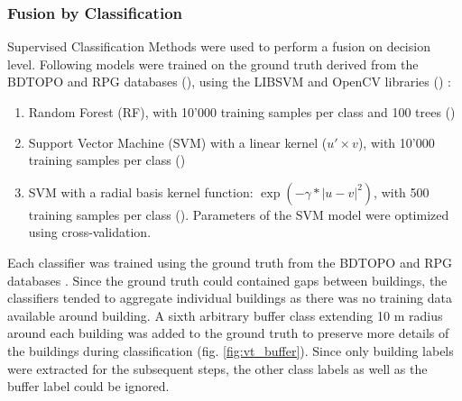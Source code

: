 \documentclass[10pt]{article}
\begin{document}
\subsubsection{Fusion by Classification}
Supervised Classification Methods were used to perform a fusion on decision level. Following models were trained on the ground truth derived from the BDTOPO and RPG databases (\cite{bdtopo,RPG}), using the LIBSVM and OpenCV libraries (\cite{libsvm,opencv}) :
\begin{enumerate}
    \item Random Forest (RF), with 10'000 training samples per class and 100 trees (\cite{opencv})
    \item Support Vector Machine (SVM) with a linear kernel ($u'\times v$), with 10'000 training samples per class (\cite{libsvm})
    \item SVM with a radial basis kernel function: $\exp(-\gamma*|u-v|^2)$, with 500 training samples per class (\cite{libsvm}). Parameters of the SVM model were optimized using cross-validation. %
\end{enumerate}
Each classifier was trained using the ground truth from the BDTOPO and RPG databases \cite{bdtopo,RPG}. Since the ground truth could contained gaps between buildings, the classifiers tended to aggregate individual buildings as there was no training data available around building. A sixth arbitrary buffer class extending 10 m radius around each building was added to the ground truth to preserve more details of the buildings during classification (fig. \ref{fig:vt_buffer}). Since only building labels were extracted for the subsequent steps, the other class labels as well as the buffer label could be ignored.
\end{document}
